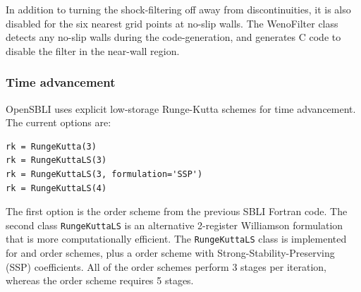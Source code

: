 \documentclass[11pt]{article}
\begin{document}
In addition to turning the shock-filtering off away from discontinuities, it is also disabled for the six nearest grid points at no-slip walls. The WenoFilter class detects any no-slip walls during the code-generation, and generates C code to disable the filter in the near-wall region. 


\subsubsection{Time advancement}
OpenSBLI uses explicit low-storage Runge-Kutta schemes for time advancement. The current options are:
\begin{lstlisting}
rk = RungeKutta(3)
rk = RungeKuttaLS(3)
rk = RungeKuttaLS(3, formulation='SSP')
rk = RungeKuttaLS(4)
\end{lstlisting}
The first option is the  order scheme from the previous SBLI Fortran code. The second class \verb|RungeKuttaLS| is an alternative 2-register Williamson formulation that is more computationally efficient. The \verb|RungeKuttaLS| class is implemented for  and  order schemes, plus a  order scheme with Strong-Stability-Preserving (SSP) coefficients. All of the  order schemes perform 3 stages per iteration, whereas the  order scheme requires 5 stages.
\end{document}
